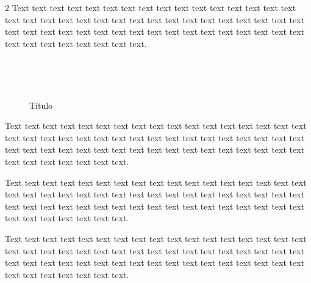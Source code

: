 \documentclass[12pt,twoside]{apa7}
\begin{document}
\begin{multicols}{2}
Text text text text text text text text text text text text text text text text text text text text text text text text text text text text text text text text text text text text text text text text text text text text text text text text text text text text text text text text text text.

\begin{figure}[H]
    \caption{Título}
    \label{fig:my_label2}
    \hfill{} \\
\hfill{} \\
\end{figure}


Text text text text text text text text text text text text text text text text text text text text text text text text text text text text text text text text text text text text text text text text text text text text text text text text text text text text text text text text text text.

Text text text text text text text text text text text text text text text text text text text text text text text text text text text text text text text text text text text text text text text text text text text text text text text text text text text text text text text text text text.

Text text text text text text text text text text text text text text text text text text text text text text text text text text text text text text text text text text text text text text text text text text text text text text text text text text text text text text text text text text.


\end{multicols}
\end{document}
